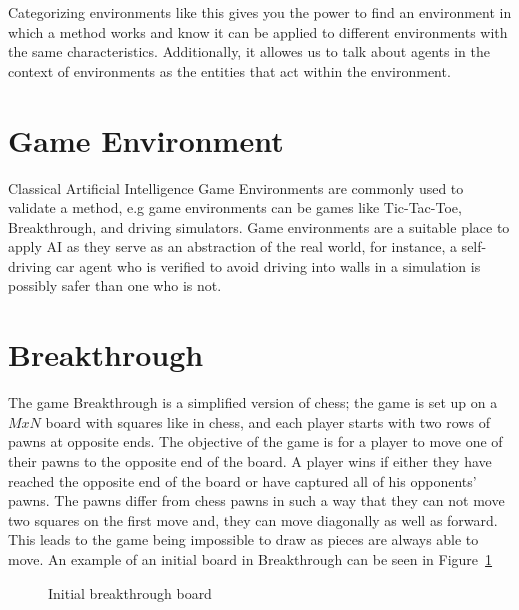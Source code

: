 Categorizing environments like this gives you the power to find an environment in which a method works and know it can be applied to different environments with the same characteristics. Additionally, it allowes us to talk about agents in the context of environments as the entities that act within the environment.

\section{Game Environment}

Classical Artificial Intelligence Game Environments are commonly used to validate a method, e.g game environments can be games like Tic-Tac-Toe, Breakthrough, and driving simulators. Game environments are a suitable place to apply AI as they serve as an abstraction of the real world, for instance, a self-driving car agent who is verified to avoid driving into walls in a simulation is possibly safer than one who is not.

\section{Breakthrough}

The game Breakthrough is a simplified version of chess; the game is set up on a $MxN$ board with squares like in chess, and each player starts with two rows of pawns at opposite ends. The objective of the game is for a player to move one of their pawns to the opposite end of the board. A player wins if either they have reached the opposite end of the board or have captured all of his opponents' pawns. The pawns differ from chess pawns in such a way that they can not move two squares on the first move and, they can move diagonally as well as forward. This leads to the game being impossible to draw as pieces are always able to move. An example of an initial board in Breakthrough can be seen in Figure~\ref{fig:initbtboard}

\begin{figure}[]
  \centering


  \caption{Initial breakthrough board}
  \label{fig:initbtboard}
\end{figure}


